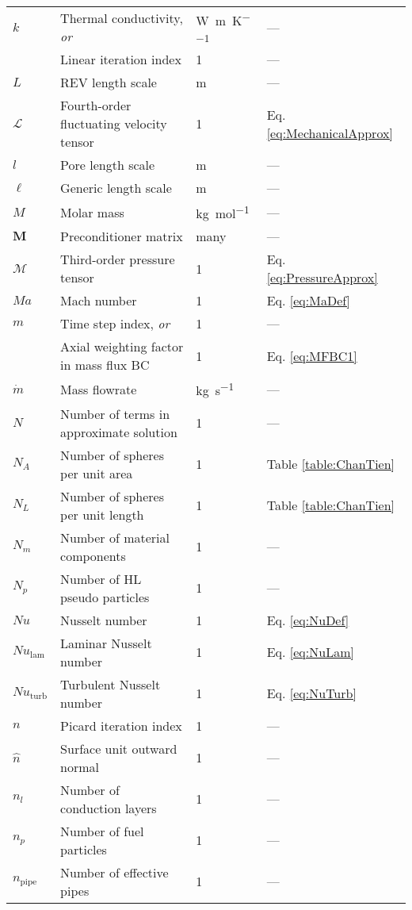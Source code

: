\begin{longtable}{p{2cm}p{9cm}p{2cm}p{5cm}}
\(k\) & Thermal conductivity, \textit{or} & \si{\watt\per\meter\per\kelvin} & ---\\
& Linear iteration index & 1 & ---\\
\(L\) & REV length scale & \si{\meter} & ---\\
\(\mathscr{L}\) & Fourth-order fluctuating velocity tensor & 1 & Eq. \eqref{eq:MechanicalApprox}\\
\(l\) & Pore length scale & \si{\meter} & ---\\
\(\ell\) & Generic length scale & \si{\meter} & ---\\
\(M\) & Molar mass & \si{\kilo\gram\per\mole} & ---\\
\(\textbf{M}\) & Preconditioner matrix & many & ---\\
\(\mathscr{M}\) & Third-order pressure tensor & 1 & Eq. \eqref{eq:PressureApprox}\\
\(Ma\) & Mach number & 1 & Eq. \eqref{eq:MaDef}\\
\(m\) & Time step index, \textit{or} & 1 & ---\\
& Axial weighting factor in mass flux BC & 1 & Eq. \eqref{eq:MFBC1}\\
\(\dot{m}\) & Mass flowrate & \si{\kilo\gram\per\second} & ---\\
\(N\) & Number of terms in approximate solution & 1 & ---\\
\(N_A\) & Number of spheres per unit area & 1 & Table \ref{table:ChanTien}\\
\(N_L\) & Number of spheres per unit length & 1 & Table \ref{table:ChanTien}\\
\(N_m\) & Number of material components & 1 & ---\\
\(N_p\) & Number of HL pseudo particles & 1 & ---\\
\(Nu\) & Nusselt number & 1 & Eq. \eqref{eq:NuDef}\\
\(Nu_\text{lam}\) & Laminar Nusselt number & 1 & Eq. \eqref{eq:NuLam}\\
\(Nu_\text{turb}\) & Turbulent Nusselt number & 1 & Eq. \eqref{eq:NuTurb}\\
\(n\) & Picard iteration index & 1 & ---\\
\(\hat{n}\) & Surface unit outward normal & 1 & ---\\
\(n_l\) & Number of conduction layers & 1 & ---\\
\(n_p\) & Number of fuel particles & 1 & ---\\
\(n_\text{pipe}\) & Number of effective pipes & 1 & ---\\

\end{longtable}
